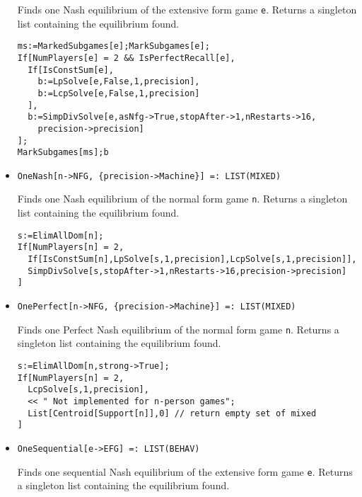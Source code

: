 \begin{itemize}
\bd 
Finds one Nash equilibrium of the extensive form game \verb+e+.
Returns a singleton list containing the equilibrium found.

\begin{verbatim}
ms:=MarkedSubgames[e];MarkSubgames[e];
If[NumPlayers[e] = 2 && IsPerfectRecall[e],
  If[IsConstSum[e],
    b:=LpSolve[e,False,1,precision],
    b:=LcpSolve[e,False,1,precision]
  ],
  b:=SimpDivSolve[e,asNfg->True,stopAfter->1,nRestarts->16,
    precision->precision]
];
MarkSubgames[ms];b
\end{verbatim} 
\ed

\item{}
\protect \large \begin{verbatim}
OneNash[n->NFG, {precision->Machine}] =: LIST(MIXED) 
\end{verbatim}\normalsize

\bd 
Finds one Nash equilibrium of the normal form game \verb+n+.
Returns a singleton list containing the equilibrium found.

\begin{verbatim}
s:=ElimAllDom[n];
If[NumPlayers[n] = 2,
  If[IsConstSum[n],LpSolve[s,1,precision],LcpSolve[s,1,precision]],
  SimpDivSolve[s,stopAfter->1,nRestarts->16,precision->precision]
]
\end{verbatim} 
\ed

\item{}
\protect \large \begin{verbatim}
OnePerfect[n->NFG, {precision->Machine}] =: LIST(MIXED) 
\end{verbatim}\normalsize

\bd 
Finds one Perfect Nash equilibrium of the normal form game
\verb+n+.  Returns a singleton list containing the equilibrium found.

\begin{verbatim}
s:=ElimAllDom[n,strong->True];
If[NumPlayers[n] = 2, 
  LcpSolve[s,1,precision],
  << " Not implemented for n-person games";
  List[Centroid[Support[n]],0] // return empty set of mixed
]
\end{verbatim} 
\ed

\item{}
\protect \large \begin{verbatim}
OneSequential[e->EFG] =: LIST(BEHAV) 
\end{verbatim}\normalsize

\bd 
Finds one sequential Nash equilibrium of the extensive form game
\verb+e+.  Returns a singleton list containing the equilibrium found.


\end{itemize}
